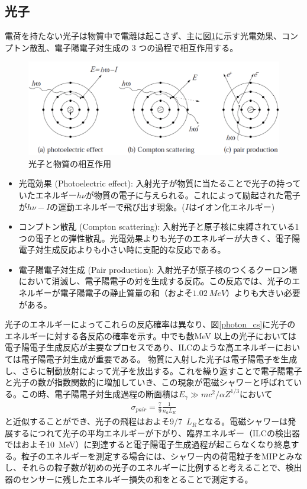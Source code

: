\subsection{光子}
電荷を持たない光子は物質中で電離は起こさず、主に図\ref{photon}に示す光電効果、コンプトン散乱、電子陽電子対生成の 3 つの過程で相互作用する。
\begin{figure}[H]
	\begin{center}
 \includegraphics[keepaspectratio, scale =0.2]
 	{Figure/Siwecal/photon.png}
 		\caption{光子と物質の相互作用}
 		\label{photon}
	\end{center}
 \end{figure}
\begin{itemize}
 \item 光電効果 (Photoelectric effect): 入射光子が物質に当たることで光子の持っていたエネルギー$h\nu$が物質の電子に与えられる。これによって励起された電子が$h\nu - I$の運動エネルギーで飛び出す現象。($I$はイオン化エネルギー)
 \item コンプトン散乱 (Compton scattering): 入射光子と原子核に束縛されている1つの電子との弾性散乱。光電効果よりも光子のエネルギーが大きく、電子陽電子対生成反応よりも小さい時に支配的な反応である。
 \item 電子陽電子対生成 (Pair production): 入射光子が原子核のつくるクーロン場において消滅し、電子陽電子の対を生成する反応。この反応では、光子のエネルギーが電子陽電子の静止質量の和（およそ$\SI{1.02}{MeV}$）よりも大きい必要がある。
\end{itemize} 
 光子のエネルギーによってこれらの反応確率は異なり、図\ref{photon_cs}に光子のエネルギーに対する各反応の確率を示す。中でも数MeV 以上の光子においては電子陽電子生成反応が主要なプロセスであり、ILCのような高エネルギーにおいては電子陽電子対生成が重要である。 物質に入射した光子は電子陽電子を生成し、さらに制動放射によって光子を放出する。これを繰り返すことで電子陽電子と光子の数が指数関数的に増加していき、この現象が電磁シャワーと呼ばれている。この時、電子陽電子対生成過程の断面積は$E_\gamma \gg mc^2/ \alpha Z^{1/3}$において
 \begin{align}
 \sigma_{pair} = \frac{7}{9}\frac{1}{n_a L_R}
 \end{align}
 と近似することができ、光子の飛程はおよそ9/7\, $L_R$となる。電磁シャワーは発展するにつれて光子の平均エネルギーが下がり、臨界エネルギー（ILCの検出器ではおよそ\SI{10}{MeV}）に到達すると電子陽電子生成過程が起こらなくなり終息する。粒子のエネルギーを測定する場合には、シャワー内の荷電粒子をMIPとみなし、それらの粒子数が初めの光子のエネルギーに比例すると考えることで、検出器のセンサーに残したエネルギー損失の和をとることで測定する。

